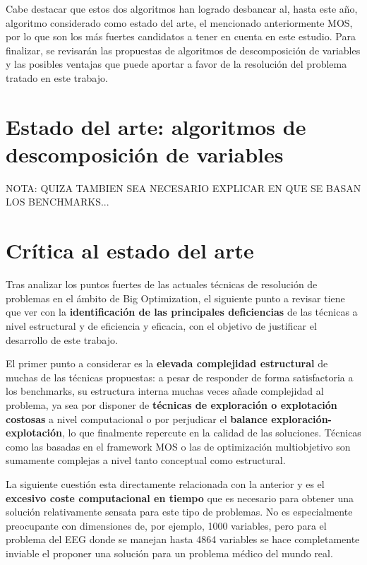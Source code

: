 Cabe destacar que estos dos algoritmos han logrado desbancar al, hasta este año, algoritmo considerado como estado del arte, el mencionado anteriormente MOS, por lo que son los más fuertes candidatos a tener en cuenta en este estudio. Para finalizar, se revisarán las propuestas de algoritmos de descomposición de variables y las posibles ventajas que puede aportar a favor de la resolución del problema tratado en este trabajo.

\section{Estado del arte: algoritmos de descomposición de variables}
NOTA: QUIZA TAMBIEN SEA NECESARIO EXPLICAR EN QUE SE BASAN LOS BENCHMARKS...


\section{Crítica al estado del arte}

Tras analizar los puntos fuertes de las actuales técnicas de resolución de problemas en el ámbito de Big Optimization, el siguiente punto a revisar tiene que ver con la \textbf{identificación de las principales deficiencias} de las técnicas a nivel estructural y de eficiencia y eficacia, con el objetivo de justificar el desarrollo de este trabajo.

El primer punto a considerar es la \textbf{elevada complejidad estructural} de muchas de las técnicas propuestas: a pesar de responder de forma satisfactoria a los benchmarks, su estructura interna muchas veces añade complejidad al problema, ya sea por disponer de \textbf{técnicas de exploración o explotación costosas} a nivel computacional o por perjudicar el \textbf{balance exploración-explotación}, lo que finalmente repercute en la calidad de las soluciones. Técnicas como las basadas en el framework MOS o las de optimización multiobjetivo son sumamente complejas a nivel tanto conceptual como estructural.

La siguiente cuestión esta directamente relacionada con la anterior y es el \textbf{excesivo coste computacional en tiempo} que es necesario para obtener una solución relativamente sensata para este tipo de problemas. No es especialmente preocupante con dimensiones de, por ejemplo, 1000 variables, pero para el problema del EEG donde se manejan hasta 4864 variables se hace completamente inviable el proponer una solución para un problema médico del mundo real. 

